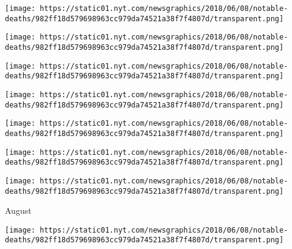 \href{https://www.nytimes.com/2018/09/06/obituaries/burt-reynolds-dead.html}{}

\texttt{[image: https://static01.nyt.com/newsgraphics/2018/06/08/notable-deaths/982ff18d579698963cc979da74521a38f7f4807d/transparent.png]}

\href{https://www.nytimes.com/2018/09/06/obituaries/richard-devos-dead-amway.html}{}

\texttt{[image: https://static01.nyt.com/newsgraphics/2018/06/08/notable-deaths/982ff18d579698963cc979da74521a38f7f4807d/transparent.png]}

\href{https://www.nytimes.com/2018/09/05/obituaries/gloria-jean-dead.html}{}

\texttt{[image: https://static01.nyt.com/newsgraphics/2018/06/08/notable-deaths/982ff18d579698963cc979da74521a38f7f4807d/transparent.png]}

\href{https://www.nytimes.com/2018/09/04/obituaries/james-mirrlees-dead.html}{}

\texttt{[image: https://static01.nyt.com/newsgraphics/2018/06/08/notable-deaths/982ff18d579698963cc979da74521a38f7f4807d/transparent.png]}

\href{https://www.nytimes.com/2018/09/04/obituaries/carole-shelley-dead.html}{}

\texttt{[image: https://static01.nyt.com/newsgraphics/2018/06/08/notable-deaths/982ff18d579698963cc979da74521a38f7f4807d/transparent.png]}

\href{https://www.nytimes.com/2018/09/01/obituaries/randy-weston-dead.html}{}

\texttt{[image: https://static01.nyt.com/newsgraphics/2018/06/08/notable-deaths/982ff18d579698963cc979da74521a38f7f4807d/transparent.png]}

\href{https://www.nytimes.com/2018/09/03/obituaries/marie-severin-versatile-comic-book-artist-dies-at-89.html}{}

\texttt{[image: https://static01.nyt.com/newsgraphics/2018/06/08/notable-deaths/982ff18d579698963cc979da74521a38f7f4807d/transparent.png]}

August

\href{https://www.nytimes.com/2018/08/31/obituaries/krishna-reddy-dead.html}{}

\texttt{[image: https://static01.nyt.com/newsgraphics/2018/06/08/notable-deaths/982ff18d579698963cc979da74521a38f7f4807d/transparent.png]}

\href{https://www.nytimes.com/2018/08/30/obituaries/paul-taylor-dead.html}{}

